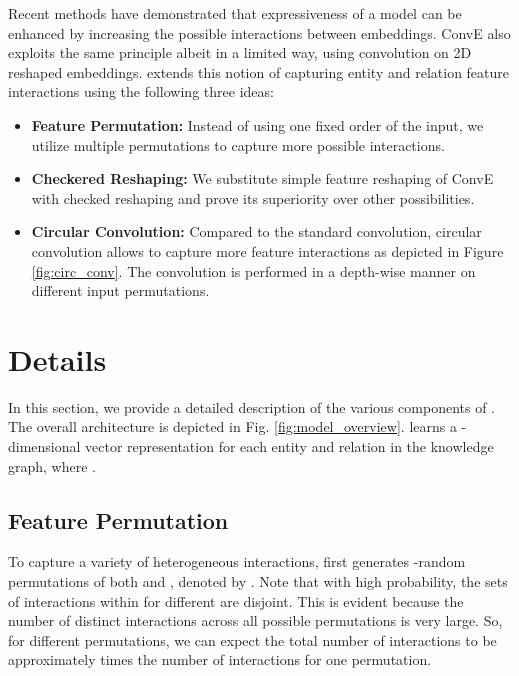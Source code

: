 \documentclass[11pt,a4paper]{article}
\begin{document}
Recent methods \cite{distmult,hole} have demonstrated that expressiveness of a model can be enhanced by increasing the possible interactions between embeddings. ConvE \cite{conve} also exploits the same principle albeit in a limited way, using convolution on 2D reshaped embeddings.
\method{} extends this notion of capturing entity and relation feature interactions using the following three ideas:

\begin{itemize}[itemsep=3pt,parsep=3pt,partopsep=3pt,leftmargin=10pt,topsep=3pt]
	\item \textbf{Feature Permutation:} Instead of using one fixed order of the input, we utilize multiple permutations to capture more possible interactions. 
\item \textbf{Checkered Reshaping:} We substitute simple feature reshaping of ConvE with checked reshaping and prove its superiority over other possibilities.
	\item \textbf{Circular Convolution:} Compared to the standard convolution, circular convolution allows to capture more feature interactions as depicted in Figure \ref{fig:circ_conv}. The convolution is performed in a depth-wise manner \cite{depthwise_convolution} on different input permutations.
\end{itemize} \section{\method{} Details}
\label{sec:details}

In this section, we provide a detailed description of the various components of \method{}. The overall architecture is depicted in Fig. \ref{fig:model_overview}. \method{} learns a -dimensional vector representation  for each entity and relation in the knowledge graph, where .

\subsection{Feature Permutation}
\label{sec:rearrange}
To capture a variety of heterogeneous interactions, \method{} first generates -random permutations of both  and , denoted by .
Note that with high probability, the sets of interactions within  for different  are disjoint. This is evident because the number of distinct interactions across all possible permutations is very large. So, for  different permutations, we can expect the total number of interactions to be approximately  times the number of interactions for one permutation.
\end{document}
